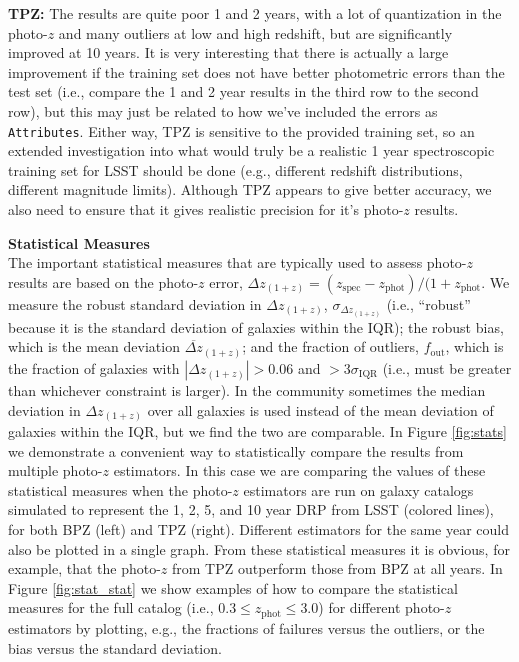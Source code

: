 \documentclass[DM,lsstdraft,toc]{lsstdoc}
\begin{document}
\textbf{TPZ:} The results are quite poor 1 and 2 years, with a lot of quantization in the photo-$z$ and many outliers at low and high redshift, but are significantly improved at 10 years. It is very interesting that there is actually a large improvement if the training set does not have better photometric errors than the test set (i.e., compare the 1 and 2 year results in the third row to the second row), but this may just be related to how we've included the errors as \texttt{Attributes}. Either way, TPZ is sensitive to the provided training set, so an extended investigation into what would truly be a realistic 1 year spectroscopic training set for LSST should be done (e.g., different redshift distributions, different magnitude limits). Although TPZ appears to give better accuracy, we also need to ensure that it gives realistic precision for it's photo-$z$ results.

\smallskip \noindent \textbf{Statistical Measures} \\
The important statistical measures that are typically used to assess photo-$z$ results are based on the photo-$z$ error, $\Delta z_{(1+z)} = (z_\mathrm{spec}-z_\mathrm{phot})/(1+z_\mathrm{phot}$. We measure the robust standard deviation in $\Delta z_{(1+z)}$, $\sigma_{\Delta z_{(1+z)}}$ (i.e., ``robust'' because it is the standard deviation of galaxies within the IQR); the robust bias, which is the mean deviation $\overline{\Delta z}_{(1+z)}$; and the fraction of outliers, $f_\mathrm{out}$, which is the fraction of galaxies with $|\Delta z_{(1+z)}|> 0.06$ and $>3\sigma_\mathrm{IQR}$ (i.e., must be greater than whichever constraint is larger). In the community sometimes the median deviation in $\Delta z_{(1+z)}$ over all galaxies is used instead of the mean deviation of galaxies within the IQR, but we find the two are comparable. In Figure \ref{fig:stats} we demonstrate a convenient way to statistically compare the results from multiple photo-$z$ estimators. In this case we are comparing the values of these statistical measures when the photo-$z$ estimators are run on galaxy catalogs simulated to represent the 1, 2, 5, and 10 year DRP from LSST (colored lines), for both BPZ (left) and TPZ (right). Different estimators for the same year could also be plotted in a single graph. From these statistical measures it is obvious, for example, that the photo-$z$ from TPZ outperform those from BPZ at all years. In Figure \ref{fig:stat_stat} we show examples of how to compare the statistical measures for the full catalog (i.e., $0.3 \leq z_\mathrm{phot} \leq 3.0$) for different photo-$z$ estimators by plotting, e.g., the fractions of failures versus the outliers, or the bias versus the standard deviation.
\end{document}
